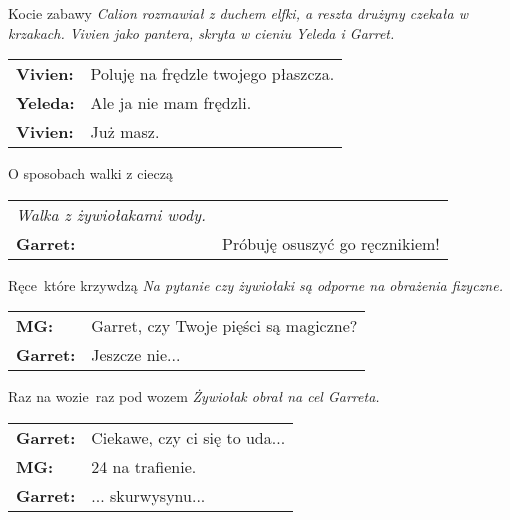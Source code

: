 \documentclass[10pt,twoside,twocolumn]{book}
\begin{document}
\begin{rpg-quotebox}{Kocie zabawy}
   \textit{Calion rozmawiał z duchem elfki, a reszta drużyny czekała w krzakach. Vivien jako pantera, skryta w cieniu Yeleda i Garret.}\\

   \begin{tabularx}{\columnwidth}{lX}
      \textbf{Vivien:} & Poluję na frędzle twojego płaszcza.\\
      \textbf{Yeleda:} & Ale ja nie mam frędzli.\\
      \textbf{Vivien:} & Już masz.\\
   \end{tabularx}
\end{rpg-quotebox}

\begin{rpg-quotebox}{O sposobach walki z cieczą}
   \begin{tabularx}{\columnwidth}{lX}
	   \textit{Walka z żywiołakami wody.}\\
	   \textbf{Garret:} & Próbuję osuszyć go ręcznikiem!\\
   \end{tabularx}
\end{rpg-quotebox}

\begin{rpg-quotebox}{Ręce\, które krzywdzą}
   \textit{Na pytanie czy żywiołaki są odporne na obrażenia fizyczne.}\\
   
   \begin{tabularx}{\columnwidth}{lX}
	   \textbf{MG:} & Garret, czy Twoje pięści są magiczne?\\
	   \textbf{Garret:} & Jeszcze nie...\\
   \end{tabularx}
\end{rpg-quotebox}

\begin{rpg-quotebox}{Raz na wozie\, raz pod wozem}
   \textit{Żywiołak obrał na cel Garreta.}\\
   
   \begin{tabularx}{\columnwidth}{lX}
      \textbf{Garret:} & Ciekawe, czy ci się to uda...\\
      \textbf{MG:} & 24 na trafienie.\\
      \textbf{Garret:} &... skurwysynu...\\
   \end{tabularx}
\end{rpg-quotebox}
\end{document}
